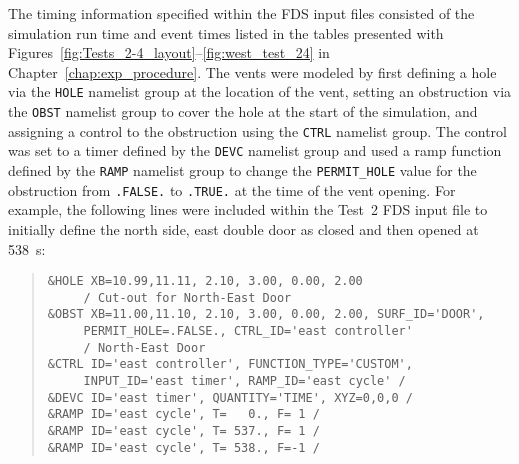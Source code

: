 The timing information specified within the FDS input files consisted of the simulation run time and event times listed in the tables presented with Figures~\ref{fig:Tests_2-4_layout}--\ref{fig:west_test_24} in Chapter~\ref{chap:exp_procedure}. The vents were modeled by first defining a hole via the \verb|HOLE| namelist group at the location of the vent, setting an obstruction via the \verb|OBST| namelist group to cover the hole at the start of the simulation, and assigning a control to the obstruction using the \verb|CTRL| namelist group. The control was set to a timer defined by the \verb|DEVC| namelist group and used a ramp function defined by the \verb|RAMP| namelist group to change the \verb|PERMIT_HOLE| value for the obstruction from \verb|.FALSE.| to \verb|.TRUE.| at the time of the vent opening. For example, the following lines were included within the Test~2 FDS input file to initially define the north side, east double door as closed and then opened at 538~s:
\begin{quote}
\begin{verbatim}
&HOLE XB=10.99,11.11, 2.10, 3.00, 0.00, 2.00 
     / Cut-out for North-East Door
&OBST XB=11.00,11.10, 2.10, 3.00, 0.00, 2.00, SURF_ID='DOOR', 
     PERMIT_HOLE=.FALSE., CTRL_ID='east controller' 
     / North-East Door
&CTRL ID='east controller', FUNCTION_TYPE='CUSTOM', 
     INPUT_ID='east timer', RAMP_ID='east cycle' /
&DEVC ID='east timer', QUANTITY='TIME', XYZ=0,0,0 /
&RAMP ID='east cycle', T=   0., F= 1 /
&RAMP ID='east cycle', T= 537., F= 1 /
&RAMP ID='east cycle', T= 538., F=-1 /
\end{verbatim}
\end{quote}

